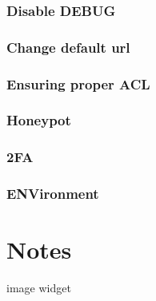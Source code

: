 \documentclass[letterpaper,12pt,english]{sphinxmanual}
\begin{document}
\subsection{Disable DEBUG}
\label{\detokenize{admin_secure:disable-debug}}

\subsection{Change default url}
\label{\detokenize{admin_secure:change-default-url}}

\subsection{Ensuring proper ACL}
\label{\detokenize{admin_secure:ensuring-proper-acl}}

\subsection{Honeypot}
\label{\detokenize{admin_secure:honeypot}}


\subsection{2FA}
\label{\detokenize{admin_secure:fa}}


\subsection{ENVironment}
\label{\detokenize{admin_secure:environment}}


\chapter{Notes}
\label{\detokenize{notes:notes}}\label{\detokenize{notes::doc}}

image widget




\renewcommand{\indexname}{Index}
\printindex
\end{document}
